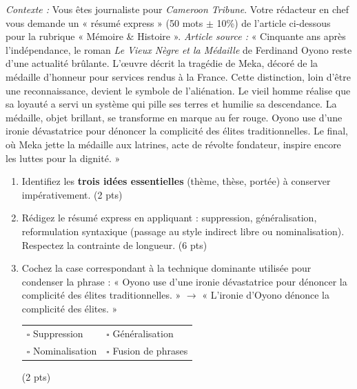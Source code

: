 \documentclass[11pt]{article}
\begin{document}
\begin{exercice}
\textit{Contexte :} Vous êtes journaliste pour \textit{Cameroon Tribune}. Votre rédacteur en chef vous demande un « résumé express » (50 mots $\pm$ 10\%) de l'article ci-dessous pour la rubrique « Mémoire \& Histoire ».
\textit{Article source :} « Cinquante ans après l'indépendance, le roman \textit{Le Vieux Nègre et la Médaille} de Ferdinand Oyono reste d'une actualité brûlante. L'œuvre décrit la tragédie de Meka, décoré de la médaille d'honneur pour services rendus à la France. Cette distinction, loin d'être une reconnaissance, devient le symbole de l'aliénation. Le vieil homme réalise que sa loyauté a servi un système qui pille ses terres et humilie sa descendance. La médaille, objet brillant, se transforme en marque au fer rouge. Oyono use d'une ironie dévastatrice pour dénoncer la complicité des élites traditionnelles. Le final, où Meka jette la médaille aux latrines, acte de révolte fondateur, inspire encore les luttes pour la dignité. »
\begin{enumerate}
    \item Identifiez les \textbf{trois idées essentielles} (thème, thèse, portée) à conserver impérativement. (2 pts)
    \item Rédigez le résumé express en appliquant : suppression, généralisation, reformulation syntaxique (passage au style indirect libre ou nominalisation). Respectez la contrainte de longueur. (6 pts)
    \item Cochez la case correspondant à la technique dominante utilisée pour condenser la phrase : « Oyono use d'une ironie dévastatrice pour dénoncer la complicité des élites traditionnelles. » $\rightarrow$ « L'ironie d'Oyono dénonce la complicité des élites. »
    \begin{tabular}{ll}
    $\square$ Suppression & $\square$ Généralisation \\
    $\square$ Nominalisation & $\square$ Fusion de phrases
    \end{tabular}
    (2 pts)
\end{enumerate}
\end{exercice}
\end{document}
